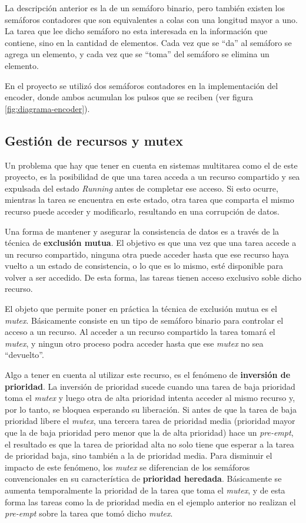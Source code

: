\documentclass{IEEEtran}
\begin{document}
La descripción anterior es la de un semáforo binario, pero también existen los semáforos contadores que son equivalentes a colas con una longitud mayor a uno. La tarea que lee dicho semáforo no esta interesada en la información que contiene, sino en la cantidad de elementos. Cada vez que se ``da'' al semáforo se agrega un elemento, y cada vez que se ``toma'' del semáforo se elimina un elemento.

En el proyecto se utilizó dos semáforos contadores en la implementación del encoder, donde ambos acumulan los pulsos que se reciben (ver figura \ref{fig:diagrama-encoder}).

\subsection{Gestión de recursos y mutex}
Un problema que hay que tener en cuenta en sistemas multitarea como el de este proyecto, es la posibilidad de que una tarea acceda a un recurso compartido y sea expulsada del estado \textit{Running} antes de completar ese acceso. Si esto ocurre, mientras la tarea se encuentra en este estado, otra tarea que comparta el mismo recurso puede acceder y modificarlo, resultando en una corrupción de datos.

Una forma de mantener y asegurar la consistencia de datos es a través de la técnica de \textbf{exclusión mutua}. El objetivo es que una vez que una tarea accede a un recurso compartido, ninguna otra puede acceder hasta que ese recurso haya vuelto a un estado de consistencia, o lo que es lo mismo, esté disponible para volver a ser accedido. De esta forma, las tareas tienen acceso exclusivo soble dicho recurso.

El objeto que permite poner en práctica la técnica de exclusión mutua es el \textit{mutex}. Básicamente consiste en un tipo de semáforo binario para controlar el acceso a un recurso. Al acceder a un recurso compartido la tarea tomará el \textit{mutex}, y ningun otro proceso podra acceder hasta que ese \textit{mutex} no sea ``devuelto''.

Algo a tener en cuenta al utilizar este recurso, es el fenómeno de \textbf{inversión de prioridad}. La inversión de prioridad sucede cuando una tarea de baja prioridad toma el \textit{mutex} y luego otra de alta prioridad intenta acceder al mismo recurso y, por lo tanto, se bloquea esperando su liberación. Si antes de que la tarea de baja prioridad libere el \textit{mutex}, una tercera tarea de prioridad media (prioridad mayor que la de baja prioridad pero menor que la de alta prioridad) hace un \textit{pre-empt}, el resultado es que la tarea de prioridad alta no solo tiene que esperar a la tarea de prioridad baja, sino también a la de prioridad media. Para disminuir el impacto de este fenómeno, los \textit{mutex} se diferencian de los semáforos convencionales en su característica de \textbf{prioridad heredada}. Básicamente se aumenta temporalmente la prioridad de la tarea que toma el \textit{mutex}, y de esta forma las tareas como la de prioridad media en el ejemplo anterior no realizan el \textit{pre-empt} sobre la tarea que tomó dicho \textit{mutex}.
\end{document}
